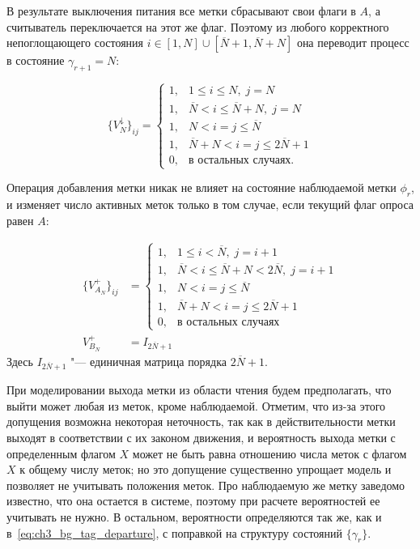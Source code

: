 В результате выключения питания все метки сбрасывают свои флаги в $A$, а считыватель переключается на этот же флаг. Поэтому из любого корректного непоглощающего состояния $i \in [1, N] \cup [\overline{N}+1, \overline{N} + N]$ она переводит процесс в состояние $\gamma_{r+1} = N$:

\begin{equation}\label{eq:ch3_fg_power_off}
	\{ V_N^\downarrow \}_{ij} = \begin{cases}
 		1, & 1 \leqslant i \leqslant N,\; j = N\\
 		1, & \overline{N} < i \leqslant \overline{N} + N,\; j = N\\
 		1, & N < i = j \leqslant \overline{N}\\
 		1, & \overline{N} + N < i = j \leqslant 2\overline{N} + 1\\
 		0, & \text{в остальных случаях}.
 	\end{cases}
\end{equation}

Операция добавления метки никак не влияет на состояние наблюдаемой метки $\phi_r$, и изменяет число активных меток только в том случае, если текущий флаг опроса равен $A$:

\begin{equation}\label{eq:ch3_fg_tag_arrival}
	\begin{aligned}
		\{ V_{A_N}^+ \}_{ij} &= \begin{cases}
 			1, & 1 \leqslant i < \overline{N},\; j = i + 1\\
 			1, & \overline{N} < i \leqslant \overline{N} + N  < 2\overline{N},\; j = i + 1\\
	 		1, & N < i = j \leqslant \overline{N}\\
 			1, & \overline{N} + N < i = j \leqslant 2\overline{N} + 1\\
 			0, & \text{в остальных случаях}
	 	\end{cases}\\
	 	V_{B_N}^+ &= I_{2\overline{N}+1}
	\end{aligned}
\end{equation}
Здесь $I_{2\overline{N}+1}$ "--- единичная матрица порядка $2\overline{N}+1$.

При моделировании выхода метки из области чтения будем предполагать, что выйти может любая из меток, кроме наблюдаемой. Отметим, что из-за этого допущения возможна некоторая неточность, так как в действительности метки выходят в соответствии с их законом движения, и вероятность выхода метки с определенным флагом $X$ может не быть равна отношению числа меток с флагом $X$ к общему числу меток; но это допущение существенно упрощает модель и позволяет не учитывать положения меток. Про наблюдаемую же метку заведомо известно, что она остается в системе, поэтому при расчете вероятностей ее учитывать не нужно. В остальном, вероятности определяются так же, как и в~\eqref{eq:ch3_bg_tag_departure}, с поправкой на структуру состояний $\{ \gamma_r \}$.

